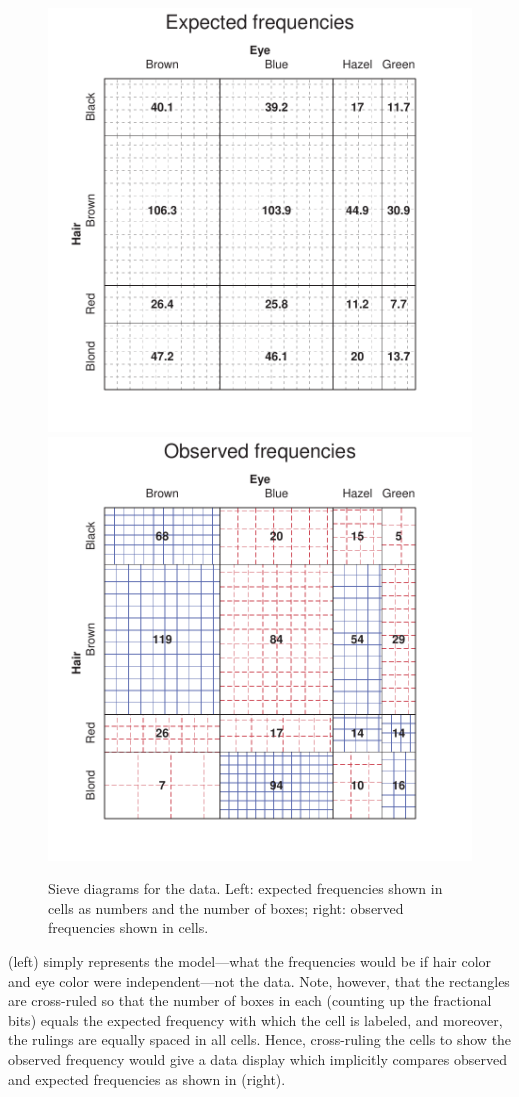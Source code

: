 \documentclass[10pt,krantz2]{krantz}\usepackage[]{graphicx}\usepackage[]{color}
\newenvironment{knitrout}{}{} %
\renewenvironment{knitrout}{\small\renewcommand{\baselinestretch}{.85}}{} %
\begin{document}
\begin{knitrout}
\color{fgcolor}\begin{figure}[!htbp]

\centerline{\includegraphics[width=.49\textwidth]{ch04/fig/HE-sieve-1} 
\includegraphics[width=.49\textwidth]{ch04/fig/HE-sieve-2} }

\caption[Sieve diagrams for the  data]{Sieve diagrams for the  data. Left: expected frequencies shown in cells as numbers and the number of boxes; right: observed frequencies shown in cells.}\label{fig:HE-sieve}
\end{figure}


\end{knitrout}

 (left) simply represents the model---what the frequencies would
be if hair color and eye color were independent---not the data.
Note, however, that the rectangles are cross-ruled so that the number of
boxes in each (counting up the fractional bits) equals the expected
frequency with which the cell is labeled, and moreover, the
rulings are equally spaced in all cells.
Hence, cross-ruling the cells to show the observed frequency
would give a data display which implicitly compares observed
and expected frequencies as shown in  (right).
\end{document}
